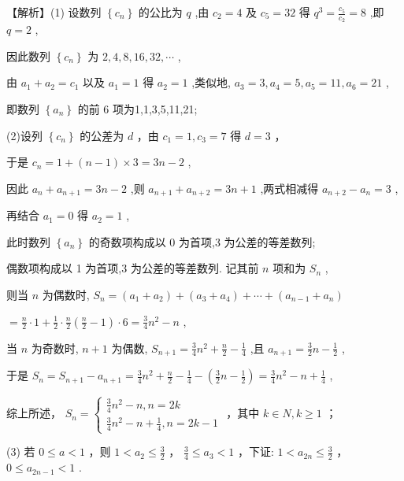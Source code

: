 \documentclass[10pt]{article}
\begin{document}
【解析】(1) 设数列 \(\left\{  {c}_{n}\right\}\) 的公比为 \(q\) ,由 \({c}_{2} = 4\) 及 \({c}_{5} = {32}\) 得 \({q}^{3} = \frac{{c}_{5}}{{c}_{2}} = 8\) ,即 \(q = 2\) ,

因此数列 \(\left\{  {c}_{n}\right\}\) 为 \(2,4,8,{16},{32},\cdots\) ,

由 \({a}_{1} + {a}_{2} = {c}_{1}\) 以及 \({a}_{1} = 1\) 得 \({a}_{2} = 1\) ,类似地, \({a}_{3} = 3,{a}_{4} = 5,{a}_{5} = {11},{a}_{6} = {21}\) ,

即数列 \(\left\{  {a}_{n}\right\}\) 的前 6 项为1,1,3,5,11,21;

(2)设列 \(\left\{  {c}_{n}\right\}\) 的公差为 \(d\) ，由 \({c}_{1} = 1,{c}_{3} = 7\) 得 \(d = 3\) ，

于是 \({c}_{n} = 1 + \left( {n - 1}\right)  \times  3 = {3n} - 2\) ,

因此 \({a}_{n} + {a}_{n + 1} = {3n} - 2\) ,则 \({a}_{n + 1} + {a}_{n + 2} = {3n} + 1\) ,两式相减得 \({a}_{n + 2} - {a}_{n} = 3\) ,

再结合 \({a}_{1} = 0\) 得 \({a}_{2} = 1\) ,

此时数列 \(\left\{  {a}_{n}\right\}\) 的奇数项构成以 0 为首项,3 为公差的等差数列;

偶数项构成以 1 为首项,3 为公差的等差数列. 记其前 \(n\) 项和为 \({S}_{n}\) ,

则当 \(n\) 为偶数时, \({S}_{n} = \left( {{a}_{1} + {a}_{2}}\right)  + \left( {{a}_{3} + {a}_{4}}\right)  + \cdots  + \left( {{a}_{n - 1} + {a}_{n}}\right)\)

\(= \frac{n}{2} \cdot  1 + \frac{1}{2} \cdot  \frac{n}{2}\left( {\frac{n}{2} - 1}\right)  \cdot  6 = \frac{3}{4}{n}^{2} - n\) ,

当 \(n\) 为奇数时, \(n + 1\) 为偶数, \({S}_{n + 1} = \frac{3}{4}{n}^{2} + \frac{n}{2} - \frac{1}{4}\) ,且 \({a}_{n + 1} = \frac{3}{2}n - \frac{1}{2}\) ,

于是 \({S}_{n} = {S}_{n + 1} - {a}_{n + 1} = \frac{3}{4}{n}^{2} + \frac{n}{2} - \frac{1}{4} - \left( {\frac{3}{2}n - \frac{1}{2}}\right)  = \frac{3}{4}{n}^{2} - n + \frac{1}{4}\) ,

综上所述， \({S}_{n} = \left\{  \begin{array}{l} \frac{3}{4}{n}^{2} - n,n = {2k} \\  \frac{3}{4}{n}^{2} - n + \frac{1}{4},n = {2k} - 1 \end{array}\right.\) ，其中 \(k \in  N,k \geq  1\) ；

(3) 若 \(0 \leq  a < 1\) ，则 \(1 < {a}_{2} \leq  \frac{3}{2}\) ， \(\frac{3}{4} \leq  {a}_{3} < 1\) ，下证: \(1 < {a}_{2n} \leq  \frac{3}{2}\) ， \(0 \leq  {a}_{{2n} - 1} < 1\) .
\end{document}
